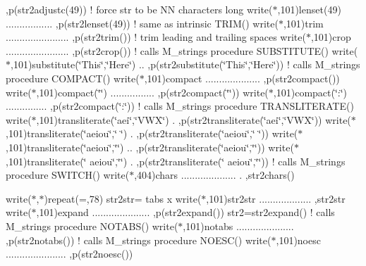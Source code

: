 \textquotesingle{},p(str2adjustc(49)) ! force str to be NN characters long write($\ast$,101)\textquotesingle{}lenset(49) ................. \textquotesingle{},p(str2lenset(49)) ! same as intrinsic T\+R\+I\+M() write($\ast$,101)\textquotesingle{}trim ....................... \textquotesingle{},p(str2trim()) ! trim leading and trailing spaces write($\ast$,101)\textquotesingle{}crop ....................... \textquotesingle{},p(str2crop()) ! calls M\+\_\+strings procedure S\+U\+B\+S\+T\+I\+T\+U\+T\+E() write($\ast$,101)\textquotesingle{}substitute(\char`\"{}\+This\char`\"{},\char`\"{}\+Here\char`\"{}) .. \textquotesingle{},p(str2substitute(\char`\"{}\+This\char`\"{},\char`\"{}\+Here\char`\"{})) ! calls M\+\_\+strings procedure C\+O\+M\+P\+A\+C\+T() write($\ast$,101)\textquotesingle{}compact .................... \textquotesingle{},p(str2compact()) write($\ast$,101)\textquotesingle{}compact(\char`\"{}\char`\"{}) ................ \textquotesingle{},p(str2compact(\char`\"{}\char`\"{})) write($\ast$,101)\textquotesingle{}compact(\char`\"{}\+:\char`\"{}) ............... \textquotesingle{},p(str2compact(\char`\"{}\+:\char`\"{})) ! calls M\+\_\+strings procedure T\+R\+A\+N\+S\+L\+I\+T\+E\+R\+A\+T\+E() write($\ast$,101)\textquotesingle{}transliterate(\char`\"{}aei\char`\"{},\char`\"{}\+V\+W\+X\char`\"{}) . \textquotesingle{},p(str2transliterate(\char`\"{}aei\char`\"{},\char`\"{}\+V\+W\+X\char`\"{})) write($\ast$,101)\textquotesingle{}transliterate(\char`\"{}aeiou\char`\"{},\char`\"{} \char`\"{}) . \textquotesingle{},p(str2transliterate(\char`\"{}aeiou\char`\"{},\char`\"{} \char`\"{})) write($\ast$,101)\textquotesingle{}transliterate(\char`\"{}aeiou\char`\"{},\char`\"{}\char`\"{}) .. \textquotesingle{},p(str2transliterate(\char`\"{}aeiou\char`\"{},\char`\"{}\char`\"{})) write($\ast$,101)\textquotesingle{}transliterate(\char`\"{} aeiou\char`\"{},\char`\"{}\char`\"{}) . \textquotesingle{},p(str2transliterate(\char`\"{} aeiou\char`\"{},\char`\"{}\char`\"{})) ! calls M\+\_\+strings procedure S\+W\+I\+T\+C\+H() write($\ast$,404)\textquotesingle{}chars .................... . \textquotesingle{},str2chars()

write($\ast$,$\ast$)repeat(\textquotesingle{}=\textquotesingle{},78) str2str=\textquotesingle{} tabs x \textquotesingle{} write($\ast$,101)\textquotesingle{}str2str ................... \textquotesingle{},str2str write($\ast$,101)\textquotesingle{}expand ..................... \textquotesingle{},p(str2expand()) str2=str2expand() ! calls M\+\_\+strings procedure N\+O\+T\+A\+B\+S() write($\ast$,101)\textquotesingle{}notabs ..................... \textquotesingle{},p(str2notabs()) ! calls M\+\_\+strings procedure N\+O\+E\+S\+C() write($\ast$,101)\textquotesingle{}noesc ...................... \textquotesingle{},p(str2noesc())

